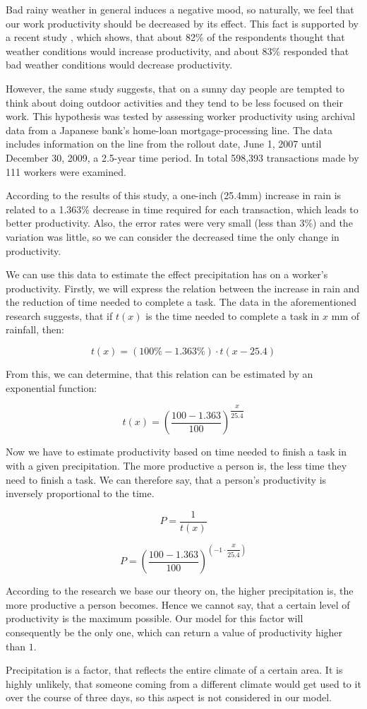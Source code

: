  
Bad rainy weather in general induces a negative mood, so naturally, we feel that our work productivity should be decreased by its effect. This fact is supported by a recent study , which shows, that about 82\% of the respondents thought that weather conditions would increase productivity, and about 83\% responded that bad weather conditions would decrease productivity.

However, the same study suggests, that on a sunny day people are tempted to think about doing outdoor activities and they tend to be less focused on their work. This hypothesis was tested by assessing worker productivity using archival data from a Japanese bank’s home-loan mortgage-processing line. The data includes information on the line from the rollout date, June 1, 2007 until December 30, 2009, a 2.5-year time period. In total 598,393 transactions made by 111 workers were examined. 

According to the results of this study, a one-inch (25.4mm) increase in rain is related to a 1.363\% decrease in time required for each transaction, which leads to better productivity. Also, the error rates were very small (less than 3\%) and the variation was  little, so we can consider the decreased time the only change in productivity. 

We can use this data to estimate the effect precipitation has on a worker's productivity. Firstly, we will express the relation between the increase in rain and the reduction of time needed to complete a task. The data in the aforementioned research suggests, that if $t(x)$ is the time needed to complete a task in $x$ mm of rainfall, then:

$$t(x)=(100\%-1.363\%) \cdot t(x-25.4)$$

From this, we can determine, that this relation can be estimated by an exponential function:

$$t(x)= \left( \dfrac{100-1.363}{100} \right)^{\dfrac{x}{25.4}}$$

Now we have to estimate productivity based on time needed to finish a task in with a given precipitation. The more productive a person is, the less time they need to finish a task. We can therefore say, that a person's productivity is inversely proportional to the time. 

$$P=\dfrac{1}{t(x)}$$

$$P=\left( \dfrac{100-1.363}{100} \right)^{\left( -1 \cdot \dfrac{x}{25.4} \right)}$$

According to the research we base our theory on, the higher precipitation is, the more productive a person becomes. Hence we cannot say, that a certain level of productivity is the maximum possible. Our model for this factor will consequently be the only one, which can return a value of productivity higher than $1$. 

Precipitation is a factor, that reflects the entire climate of a certain area. It is highly unlikely, that someone coming from a different climate would get used to it over the course of three days, so this aspect is not considered in our model.

